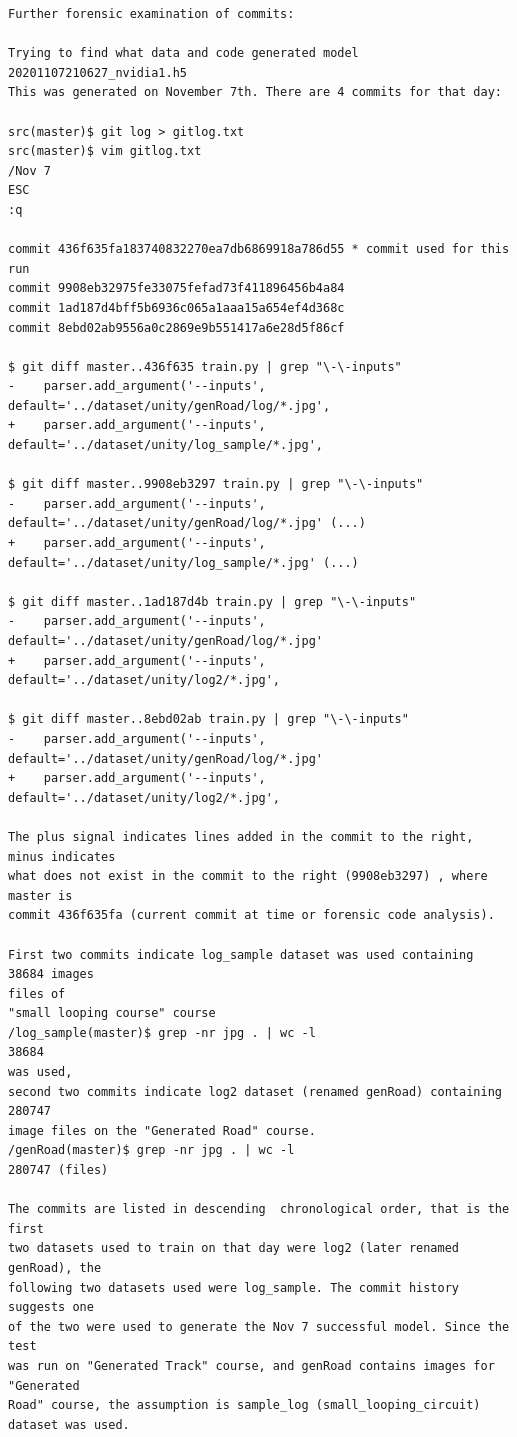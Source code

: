 \begin{verbatim}
Further forensic examination of commits:

Trying to find what data and code generated model 20201107210627_nvidia1.h5
This was generated on November 7th. There are 4 commits for that day:

src(master)$ git log > gitlog.txt
src(master)$ vim gitlog.txt 
/Nov 7
ESC
:q

commit 436f635fa183740832270ea7db6869918a786d55 * commit used for this run
commit 9908eb32975fe33075fefad73f411896456b4a84 
commit 1ad187d4bff5b6936c065a1aaa15a654ef4d368c
commit 8ebd02ab9556a0c2869e9b551417a6e28d5f86cf

$ git diff master..436f635 train.py | grep "\-\-inputs"
-    parser.add_argument('--inputs', default='../dataset/unity/genRoad/log/*.jpg',
+    parser.add_argument('--inputs', default='../dataset/unity/log_sample/*.jpg', 

$ git diff master..9908eb3297 train.py | grep "\-\-inputs"
-    parser.add_argument('--inputs', default='../dataset/unity/genRoad/log/*.jpg' (...)
+    parser.add_argument('--inputs', default='../dataset/unity/log_sample/*.jpg' (...)

$ git diff master..1ad187d4b train.py | grep "\-\-inputs"
-    parser.add_argument('--inputs', default='../dataset/unity/genRoad/log/*.jpg'
+    parser.add_argument('--inputs', default='../dataset/unity/log2/*.jpg', 

$ git diff master..8ebd02ab train.py | grep "\-\-inputs"
-    parser.add_argument('--inputs', default='../dataset/unity/genRoad/log/*.jpg'
+    parser.add_argument('--inputs', default='../dataset/unity/log2/*.jpg',

The plus signal indicates lines added in the commit to the right, minus indicates
what does not exist in the commit to the right (9908eb3297) , where master is 
commit 436f635fa (current commit at time or forensic code analysis).

First two commits indicate log_sample dataset was used containing 38684 images 
files of
"small looping course" course
/log_sample(master)$ grep -nr jpg . | wc -l
38684
was used, 
second two commits indicate log2 dataset (renamed genRoad) containing 280747 
image files on the "Generated Road" course.
/genRoad(master)$ grep -nr jpg . | wc -l
280747 (files)

The commits are listed in descending  chronological order, that is the first 
two datasets used to train on that day were log2 (later renamed genRoad), the
following two datasets used were log_sample. The commit history suggests one
of the two were used to generate the Nov 7 successful model. Since the test 
was run on "Generated Track" course, and genRoad contains images for "Generated
Road" course, the assumption is sample_log (small_looping_circuit) dataset was used.


\end{verbatim}
